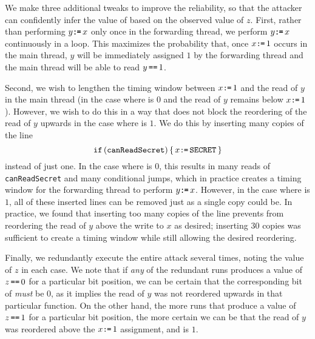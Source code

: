 We make three additional tweaks to improve the reliability, so that the attacker
can confidently infer the value of {\SEC} based on the observed value of $z$.
  First, rather than performing $y\texttt{:}\mkern-1mu\texttt{=}\, x$ only once in the forwarding thread,
we perform $y\texttt{:}\mkern-1mu\texttt{=}\, x$ continuously in a loop.
This maximizes the probability that, once $x\texttt{:}\mkern-1mu\texttt{=}\, 1$ occurs in the main
thread, $y$ will be immediately assigned $1$ by the forwarding thread
and the main thread will be able to read $y\,\texttt{==}\, 1$.

Second, we wish to lengthen the timing window between $x\texttt{:}\mkern-1mu\texttt{=}\, 1$ and the
read of $y$ in the main thread (in the case where
{\SEC} is $0$ and the read of $y$ remains below $x\texttt{:}\mkern-1mu\texttt{=}\, 1$).
However, we wish to do this in a way that does not block the reordering of the
read of $y$ upwards in the case where {\SEC} is $1$.
We do this by inserting many copies of the line
\[
  \texttt{if}\, (\texttt{canReadSecret}) \,\{\, x\texttt{:}\mkern-1mu\texttt{=}\,\texttt{SECRET}\,\}
\]
instead of just one.
In the case where {\SEC} is $0$, this
results in many reads of \verb|canReadSecret| and many conditional jumps,
which in practice creates a timing window for the forwarding thread to perform
$y\texttt{:}\mkern-1mu\texttt{=}\, x$.
However, in the case where {\SEC} is $1$,
all of these inserted lines can be removed just as a single copy could be.
In practice, we found that inserting too many copies of the line prevents
{\GCC} from reordering the read of $y$ above the write to $x$ as
desired; inserting $30$ copies was sufficient to create a timing window
while still allowing the desired reordering.

Finally, we redundantly execute the entire attack several times, noting the
value of $z$ in each case.
We note that if \emph{any} of the redundant runs produces a value of
$z\,\texttt{==}\,0$ for a particular bit position, we can be certain that the
corresponding bit of {\SEC} \emph{must} be $0$, as it implies the
read of $y$ was not reordered upwards in that particular function.
On the other hand, the more runs that produce a value of $z\,\texttt{==}\,1$ for a
particular bit position, the more certain we can be that the read of $y$
was reordered above the $x\texttt{:}\mkern-1mu\texttt{=}\, 1$ assignment, and {\SEC} is $1$.

